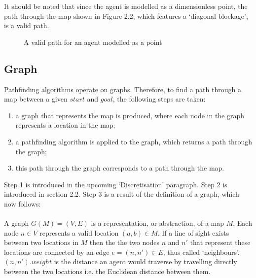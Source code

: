 \documentclass[12pt,notitlepage]{report}
\begin{document}
\noindent
It should be noted that since the agent is modelled as a dimensionless point, the path through the map shown in Figure 2.2, which features a `diagonal blockage', is a valid path.\\

\begin{figure}
    \centering
  \caption{A valid path for an agent modelled as a point}
\end{figure}

\subsection{Graph}

Pathfinding algorithms operate on graphs. Therefore, to find a path through a map between a given $start$ and $goal$, the following steps are taken:
\begin{enumerate}
\item a graph that represents the map is produced, where each node in the graph represents a location in the map; 
\item a pathfinding algorithm is applied to the graph, which returns a path through the graph;
\item this path through the graph corresponds to a path through the map.
\end{enumerate}
Step 1 is introduced in the upcoming `Discretisation' paragraph. Step 2 is introduced in section 2.2. Step 3 is a result of the definition of a graph, which now follows:\\

\\
\noindent
A graph $G(M)=(V,E)$ is a representation, or abstraction, of a map $M$. Each node $n \in V$ represents a valid location $(a,b) \in M$. If a line of sight exists between two locations in $M$ then the the two nodes $n$ and $n'$ that represent these locations are connected by an edge $e=(n,n') \in E$, thus called `neighbours'. $(n,n').weight$ is the distance an agent would traverse by travelling directly between the two locations i.e. the Euclidean distance between them.
\end{document}
